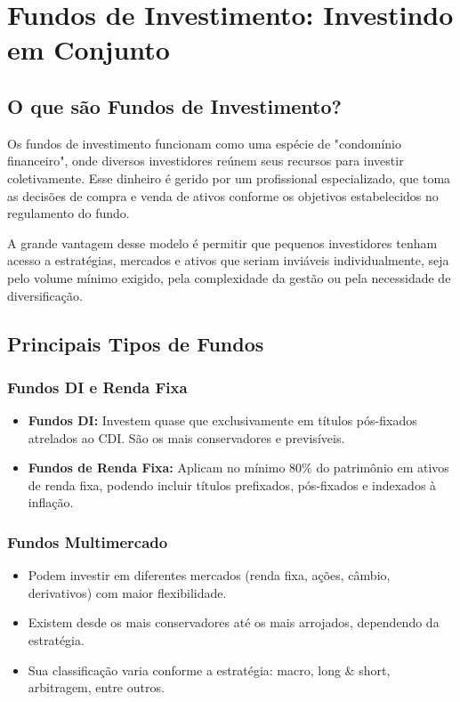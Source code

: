 \chapter{Fundos de Investimento: Investindo em Conjunto}

\section{O que são Fundos de Investimento?}

\noindent Os fundos de investimento funcionam como uma espécie de "condomínio financeiro", onde diversos investidores reúnem seus recursos para investir coletivamente. Esse dinheiro é gerido por um profissional especializado, que toma as decisões de compra e venda de ativos conforme os objetivos estabelecidos no regulamento do fundo.

\vspace{0.3cm}
\noindent A grande vantagem desse modelo é permitir que pequenos investidores tenham acesso a estratégias, mercados e ativos que seriam inviáveis individualmente, seja pelo volume mínimo exigido, pela complexidade da gestão ou pela necessidade de diversificação.

\section{Principais Tipos de Fundos}

\subsection{Fundos DI e Renda Fixa}
\begin{itemize}[leftmargin=*]
    \item \textbf{Fundos DI:} Investem quase que exclusivamente em títulos pós-fixados atrelados ao CDI. São os mais conservadores e previsíveis.
    \item \textbf{Fundos de Renda Fixa:} Aplicam no mínimo 80\% do patrimônio em ativos de renda fixa, podendo incluir títulos prefixados, pós-fixados e indexados à inflação.
    
\end{itemize}

\subsection{Fundos Multimercado}
\begin{itemize}[leftmargin=*]
    \item Podem investir em diferentes mercados (renda fixa, ações, câmbio, derivativos) com maior flexibilidade.
    \item Existem desde os mais conservadores até os mais arrojados, dependendo da estratégia.
    \item Sua classificação varia conforme a estratégia: macro, long \& short, arbitragem, entre outros.
   
\end{itemize}

